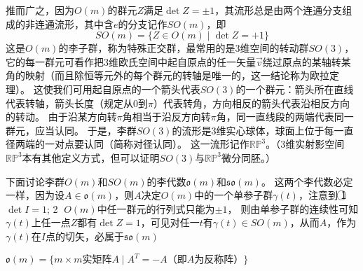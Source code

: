 推而广之，因为$O(m)$的群元$Z$满足$\det Z = \pm 1$，其流形总是由两个连通分支组成的非连通流形，其中含$e$的分支记作$SO(m)$，即
$$SO(m) = \{Z \in O(m) \mid \det Z = +1\}$$
这是$O(m)$的李子群，称为特殊正交群，最常用的是$3$维空间的转动群$SO(3)$，它的每一群元可看作把$3$维欧氏空间中起自原点的任一矢量$\vec v$绕过原点的某轴转某角的映射（而且除恒等元外的每个群元的转轴是唯一的，这一结论称为欧拉定理）。
这使我们可用起自原点的一个箭头代表$SO(3)$的一个群元：箭头所在直线代表转轴，箭头长度（规定从$0$到$\pi$）代表转角，方向相反的箭头代表沿相反方向的转动。
由于沿某方向转$\pi$角相当于沿反方向转$\pi$角，同一直线段的两端代表同一群元，应当认同。
于是，李群$SO(3)$的流形是$3$维实心球体，球面上位于每一直径两端的一对点要认同（简称对径认同）。
这一流形记作$\mathbb{RP}^3$。（$3$维实射影空间$\mathbb{RP}^3$本有其他定义方式，但可以证明$SO(3)$与$\mathbb{RP}^3$微分同胚。）

下面讨论李群$O(m)$和$SO(m)$的李代数$\mathfrak{o}(m)$和$\mathfrak{so}(m)$。
这两个李代数必定一样，因为设$A \in \mathfrak{o}(m)$，则$A$决定$O(m)$中的一个单参子群$\gamma(t)$，注意到
\textcircled{1} $\det I = 1$;
\textcircled{2} $O(m)$中任一群元的行列式只能为$\pm 1$，
则由单参子群的连续性可知$\gamma(t)$上任一点$Z$都有$\det Z = 1$，可见对任一$t$有$\gamma(t) \in SO(m)$，从而$A$，作为$\gamma(t)$在$I$点的切矢，必属于$\mathfrak{so}(m)$

\begin{theorem}
    $\mathfrak{o}(m) = \{m \times m \text{实矩阵} A \mid A^T = -A\text{（即$A$为反称阵）}\}$
\end{theorem}

